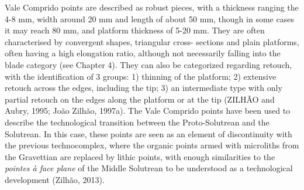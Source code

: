 \documentclass[12pt,twoside]{reedthesis}
\begin{document}
Vale Comprido points are described as robust pieces, with a thickness ranging the 4-8 mm, width around 20 mm and length of about 50 mm, though in some cases it may reach 80 mm, and platform thickness of 5-20 mm. They are often characterised by convergent shapes, triangular cross- sections and plain platforms, often having a high elongation ratio, although not necessarily falling into the blade category (see Chapter 4). They can also be categorized regarding retouch, with the identification of 3 groups: 1) thinning of the platform; 2) extensive retouch across the edges, including the tip; 3) an intermediate type with only partial retouch on the edges along the platform or at the tip (ZILHÃO and Aubry, 1995; João Zilhão, 1997a). The Vale Comprido points have been used to describe the technological transition between the Proto-Solutrean and the Solutrean. In this case, these points are seen as an element of discontinuity with the previous technocomplex, where the organic points armed with microliths from the Gravettian are replaced by lithic points, with enough similarities to the \emph{pointes à face plane} of the Middle Solutrean to be understood as a technological development (Zilhão, 2013).
\end{document}
